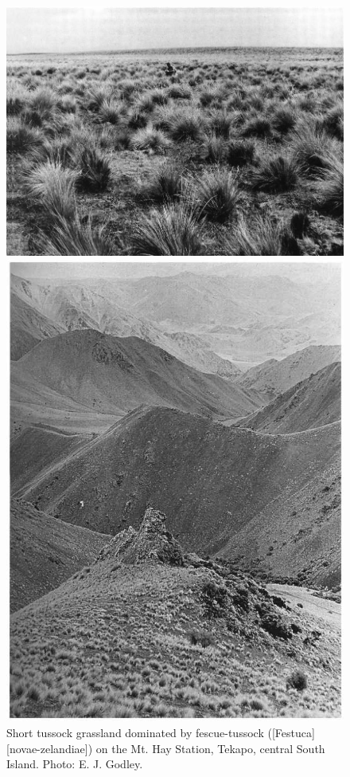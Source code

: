 \begin{figure}[htb]
	\centering
	\begin{minipage}[t]{0.637\textwidth}
		\centering
		\includegraphics[width=\textwidth]{graphics/figure81short-tussock.jpg}
    	\caption[Short tussock grassland dominated by fescue-tussock]{Short tussock grassland dominated by fescue-tussock ([Festuca][novae-zelandiae]) on the Mt.
    	Hay Station, Tekapo, central South Island.
    	Photo:  E. J. Godley.}%
    	\label{fig:81short-tussock}
	\end{minipage}\hfill%
	\begin{minipage}[t]{0.343\textwidth}
    	\centering
    	\includegraphics[width=\textwidth]{graphics/figure82short-tussock.jpg}

\end{minipage}
\end{figure}
